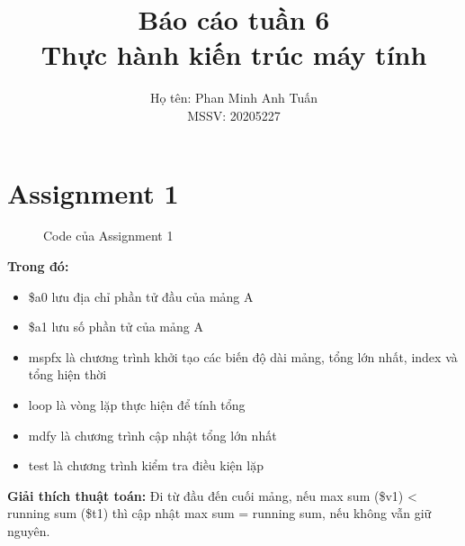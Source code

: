 \documentclass[a4paper,12pt]{article}
\title{\textbf{Báo cáo tuần 6 \\ Thực hành kiến trúc máy tính}}
\author{Họ tên: Phan Minh Anh Tuấn \\ MSSV: 20205227}
\date{}
\begin{document}
	\maketitle
	\tableofcontents
	\newpage
\section{Assignment 1}
\begin{figure}[!h]
	\centerline{}
	\caption{Code của Assignment 1}
	\label{fig:ass1}
\end{figure}
\noindent
\textbf{Trong đó: }
\begin{itemize}
	\item \$a0 lưu địa chỉ phần tử đầu của mảng A
	\item \$a1 lưu số phần tử của mảng A
	\item mspfx là chương trình khởi tạo các biến độ dài mảng, tổng lớn nhất, index và tổng hiện thời
	\item loop là vòng lặp thực hiện để tính tổng
	\item mdfy là chương trình cập nhật tổng lớn nhất
	\item test là chương trình kiểm tra điều kiện lặp
\end{itemize}
\textbf{Giải thích thuật toán: }Đi từ đầu đến cuối mảng, nếu max sum (\$v1) < running sum (\$t1) thì cập nhật max sum = running sum, nếu không vẫn giữ nguyên.
\clearpage
\end{document}
